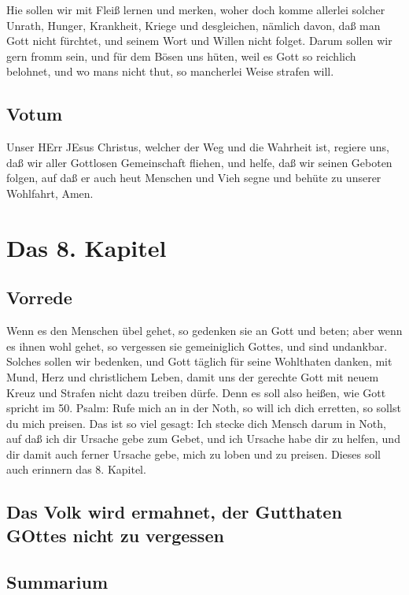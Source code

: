 Hie sollen wir mit Fleiß lernen und merken, woher doch komme allerlei solcher Unrath, Hunger, Krankheit, Kriege und desgleichen, nämlich davon, daß man Gott nicht fürchtet, und seinem
Wort und Willen nicht folget. Darum sollen wir gern fromm sein, und für dem Bösen uns hüten, weil es Gott so reichlich belohnet, und wo mans nicht thut, so mancherlei Weise strafen will.

\section{Votum}

Unser HErr JEsus Christus, welcher der Weg und die Wahrheit ist, regiere uns, daß wir aller Gottlosen Gemeinschaft fliehen, und helfe, daß wir seinen Geboten folgen, auf daß er auch heut Menschen und Vieh segne und behüte zu unserer Wohlfahrt, Amen.

\chapter{Das 8. Kapitel}

\section{Vorrede}

Wenn es den Menschen übel gehet, so gedenken sie an Gott und beten; aber wenn es ihnen wohl gehet, so vergessen sie gemeiniglich Gottes, und sind undankbar. Solches sollen wir bedenken, und Gott täglich für seine Wohlthaten danken, mit Mund, Herz und christlichem Leben, damit uns der gerechte Gott mit neuem Kreuz und Strafen nicht dazu treiben dürfe. Denn es soll also heißen, wie Gott spricht im 50. Psalm: Rufe mich an in der Noth, so will ich dich erretten, so sollst du mich preisen. Das ist so viel gesagt: Ich stecke dich Mensch darum in Noth, auf daß ich dir Ursache gebe zum Gebet, und ich Ursache habe dir zu helfen, und dir damit auch ferner Ursache gebe, mich zu loben und zu preisen. Dieses soll auch erinnern das 8. Kapitel.

\section[Das Volk wird ermahnet, der Gutthaten GOttes nicht]{Das Volk wird ermahnet, der Gutthaten GOttes nicht zu vergessen}

\section{Summarium}

